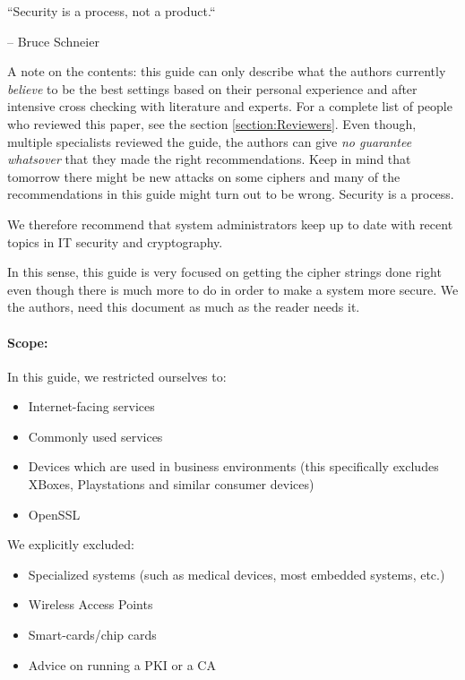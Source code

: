 \epigraph{``Security is a process, not a product.``}{-- Bruce Schneier}

A note on the contents: this guide can only describe what the authors currently
\emph{believe} to be the best settings based on their personal experience and
after intensive cross checking with literature and experts. For a complete list
of people who reviewed this paper, see the section \ref{section:Reviewers}.
Even though, multiple specialists reviewed the guide, the authors can give
\emph{no guarantee whatsover} that they made the right recommendations. Keep in
mind that tomorrow there might be new attacks on some ciphers and many of the
recommendations in this guide might turn out to be wrong. Security is a
process.


We therefore recommend that system administrators keep up to date with recent
topics in IT security and cryptography. 


In this sense, this guide is very focused on getting the cipher strings done
right even though there is much more to do in order to make a system more
secure.  We the authors, need this document as much as the reader needs it.

\paragraph{Scope:}
\label{section:Scope}

In this guide, we restricted ourselves to:
\begin{itemize}
\item Internet-facing services
\item Commonly used services
\item Devices which are used in business environments (this specifically excludes XBoxes, Playstations and similar consumer devices)
\item OpenSSL 
\end{itemize}

We explicitly excluded:
\begin{itemize}
\item Specialized systems (such as medical devices, most embedded systems, etc.)
\item Wireless Access Points
\item Smart-cards/chip cards
\item Advice on running a PKI or a CA
\end{itemize}

